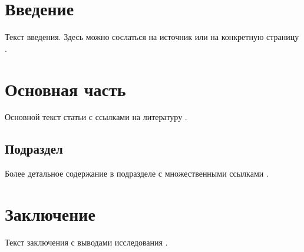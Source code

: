 \documentclass[12pt]{article}
\begin{document}



\vspace{1em}


\section{Введение}

Текст введения. Здесь можно сослаться на источник  или на конкретную страницу .

\section{Основная часть}

Основной текст статьи с ссылками на литературу .

\subsection{Подраздел}

Более детальное содержание в подразделе с множественными ссылками .

\section{Заключение}

Текст заключения с выводами исследования .

%

\bibliographyru
\end{document}
